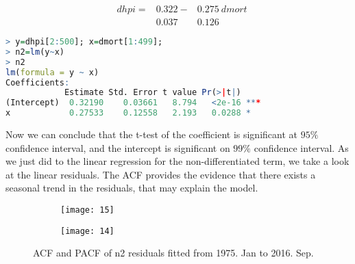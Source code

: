 \documentclass[12pt,letterpaper]{article}
\begin{document}
\begin{equation}
\begin{aligned}
&dhpi =&0.322  -  &0.275 { \ }dmort \\
&         & 0.037   \quad&0.126
\end{aligned}
\end{equation}

{\footnotesize
\begin{lstlisting}[language=R]
> y=dhpi[2:500]; x=dmort[1:499];
> n2=lm(y~x)
> n2
lm(formula = y ~ x)
Coefficients:
            Estimate Std. Error t value Pr(>|t|)    
(Intercept)  0.32190    0.03661   8.794   <2e-16 ***
x            0.27533    0.12558   2.193   0.0288 *  
\end{lstlisting}
}

Now we can conclude that the t-test of the coefficient is significant at $95\%$ confidence interval, and the intercept is significant on $99\%$ confidence interval.
As we just did to the linear regression for the non-differentiated term, we take a look at the linear residuals.
The ACF provides the evidence that there exists a seasonal trend in the residuals, that may explain the model.

\begin{figure*}[h!]
\begin{subfigure}[b]{0.4\textwidth}
\begin{center}
 \texttt{[image: 15]}
 \vspace{-0.4cm}
\end{center}
\end{subfigure}
\qquad
\qquad
\begin{subfigure}[b]{0.4\textwidth}
\begin{center}
 \texttt{[image: 14]}
 \vspace{-0.4cm}
\end{center}
\end{subfigure}
 \vspace{-.1cm}
 \caption{ ACF and PACF of n2 residuals fitted from 1975. Jan to 2016. Sep.}
      \label{fig:time}
\vspace{-.25cm}
\end{figure*}
\end{document}
